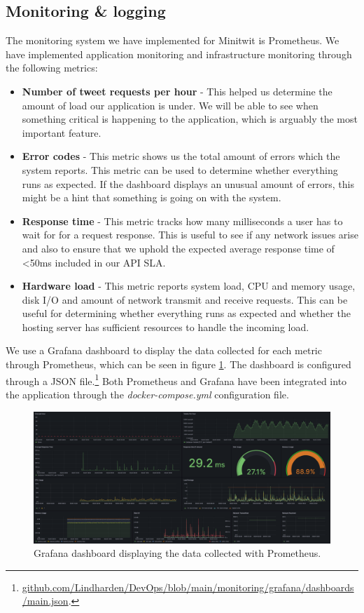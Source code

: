 \subsection{Monitoring \& logging}
The monitoring system we have implemented for Minitwit is Prometheus. We have implemented application monitoring and infrastructure monitoring through the following metrics:
\begin{itemize}
    \item \textbf{Number of tweet requests per hour} - This helped us determine the amount of load our application is under. We will be able to see when something critical is happening to the application, which is arguably the most important feature.
    \item \textbf{Error codes} - This metric shows us the total amount of errors which the system reports. This metric can be used to determine whether everything runs as expected. If the dashboard displays an unusual amount of errors, this might be a hint that something is going on with the system.
    \item \textbf{Response time} - This metric tracks how many milliseconds a user has to wait for for a request response. This is useful to see if any network issues arise and also to ensure that we uphold the expected average response time of <50ms included in our API SLA.
    \item \textbf{Hardware load} - This metric reports system load, CPU and memory usage, disk I/O and amount of network transmit and receive requests. This can be useful for determining whether everything runs as expected and whether the hosting server has sufficient resources to handle the incoming load.
\end{itemize}
We use a Grafana dashboard to display the data collected for each metric through Prometheus, which can be seen in figure \ref{fig:grafana_dashboard}. The dashboard is configured through a JSON file.\footnote{\href{https://github.com/Lindharden/DevOps/blob/main/monitoring/grafana/dashboards/main.json}{github.com/Lindharden/DevOps/blob/main/monitoring/grafana/dashboards/main.json}.} Both Prometheus and Grafana have been integrated into the application through the \textit{docker-compose.yml} configuration file.

\begin{figure}[H]
    \centering
    \includegraphics[width=\textwidth]{images/grafana.png}
    \caption{Grafana dashboard displaying the data collected with Prometheus.}
    \label{fig:grafana_dashboard}
\end{figure}

